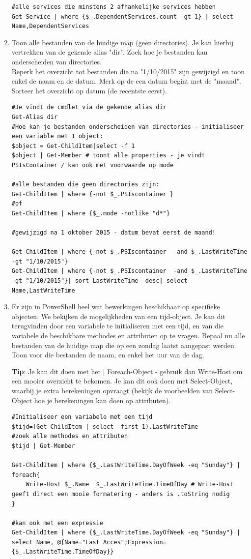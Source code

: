 \documentclass[11pt,a4paper]{report}
\begin{document}
\begin{enumerate}
\begin{lstlisting}
#alle services die minstens 2 afhankelijke services hebben
Get-Service | where {$_.DependentServices.count -gt 1} | select Name,DependentServices
	\end{lstlisting}
	\item Toon alle bestanden van de huidige map (geen directories). Je kan hierbij vertrekken van de gekende alias "dir". Zoek hoe je bestanden kan onderscheiden van directories.
	\\Beperk het overzicht tot bestanden die na "1/10/2015" zijn gewijzigd en toon enkel de naam en de datum. Merk op de een datum begint met de "maand". Sorteer het overzicht op datum (de recentste eerst). 
	\begin{lstlisting}
#Je vindt de cmdlet via de gekende alias dir
Get-Alias dir
#Hoe kan je bestanden onderscheiden van directories - initialiseer een variable met 1 object:
$object = Get-ChildItem|select -f 1
$object | Get-Member # toont alle properties - je vindt PSIsContainer / kan ook met voorwaarde op mode

#alle bestanden die geen directories zijn:
Get-ChildItem | where {-not $_.PSIscontainer } 
#of
Get-ChildItem | where {$_.mode -notlike "d*"} 

#gewijzigd na 1 oktober 2015 - datum bevat eerst de maand!

Get-ChildItem | where {-not $_.PSIscontainer  -and $_.LastWriteTime -gt "1/10/2015"}
Get-ChildItem | where {-not $_.PSIscontainer  -and $_.LastWriteTime -gt "1/10/2015"}| sort LastWriteTime -desc| select Name,LastWriteTime
	\end{lstlisting}
	\item Er zijn in PowerShell heel wat bewerkingen beschikbaar op specifieke objecten. We bekijken de mogelijkheden van een tijd-object. Je kan dit terugvinden door een variabele te initialiseren met een tijd, en van die variabele de beschikbare methodes en attributen op te vragen. Bepaal nu alle bestanden van de huidige map die op een zondag laatst aangepast werden. Toon voor die bestanden de naam, en enkel het uur van de dag.
	\par \textbf{Tip}: Je kan dit doen met het $|$ Foreach-Object - gebruik dan Write-Host om een mooier overzicht te bekomen. Je kan dit ook doen met Select-Object, waarbij je extra berekeningen opvraagt (bekijk de voorbeelden van Select-Object hoe je berekeningen kan doen op attributen).
	\begin{lstlisting}
#Initialiseer een variabele met een tijd
$tijd=(Get-ChildItem | select -first 1).LastWriteTime
#zoek alle methodes en attributen
$tijd | Get-Member

Get-ChildItem | where {$_.LastWriteTime.DayOfWeek -eq "Sunday"} | 
foreach{
	Write-Host $_.Name  $_.LastWriteTime.TimeOfDay # Write-Host geeft direct een mooie formatering - anders is .toString nodig
}

#kan ook met een expressie
Get-ChildItem | where {$_.LastWriteTime.DayOfWeek -eq "Sunday"} | 
select Name, @{Name="Last Acces";Expression={$_.LastWriteTime.TimeOfDay}}
	\end{lstlisting}
\end{enumerate}
\end{document}
